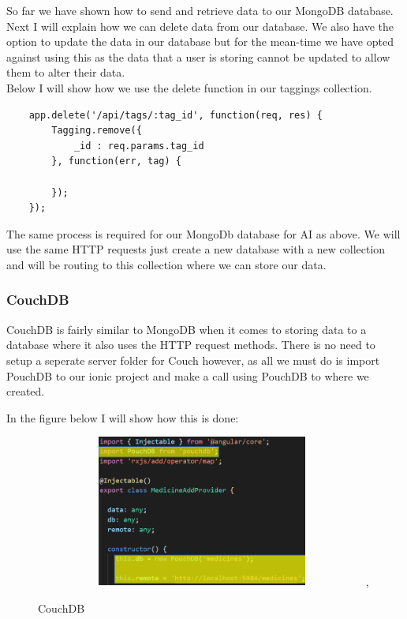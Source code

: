 \documentclass[12pt,a4paper,oneside,openany]{book}
\begin{document}
So far we have shown how to send and retrieve data to our MongoDB database.\\


Next I will explain how we can delete data from our database. We also have the option to update the data in our database but for the mean-time we have opted against using this as the data that a user is storing cannot be updated to allow them to alter their data.\\

Below I will show how we use the delete function in our taggings collection.

\begin{verbatim}
    app.delete('/api/tags/:tag_id', function(req, res) {
        Tagging.remove({
            _id : req.params.tag_id
        }, function(err, tag) {

        });
    });
\end{verbatim}

\newpage

The same process is required for our MongoDb database for AI as above. We will use the same HTTP requests just create a new database with a new collection and will be routing to this collection where we can store our data.\\

\subsubsection{CouchDB}
CouchDB is fairly similar to MongoDB when it comes to storing data to a database where it also uses the HTTP request methods. There is no need to setup a seperate server folder for Couch however, as all we must do is import PouchDB to our ionic project and make a call using PouchDB to where we created.

In the figure below I will show how this is done:

\begin{figure}[ht]
\renewcommand\thefigure{5.5}
\centering
\includegraphics[width=11cm,height=5cm]{Images/pouch.png},
\caption{CouchDB}
\label{couch}
\end{figure}
\end{document}
